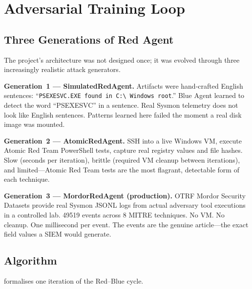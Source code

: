 \documentclass[sigconf, nonacm]{acmart}
\begin{document}
\section{Adversarial Training Loop}
\label{sec:loop}

\subsection{Three Generations of Red Agent}

The project's architecture was not designed once; it was evolved through
three increasingly realistic attack generators.

\textbf{Generation~1 — SimulatedRedAgent.} Artifacts were hand-crafted
English sentences: ``\texttt{PSEXESVC.EXE found in C:\textbackslash
Windows root}.'' Blue Agent learned to detect the word ``PSEXESVC''
in a sentence. Real Sysmon telemetry does not look like English sentences.
Patterns learned here failed the moment a real disk image was mounted.

\textbf{Generation~2 — AtomicRedAgent.} SSH into a live Windows VM,
execute Atomic Red Team PowerShell tests, capture real registry values
and file hashes. Slow (seconds per iteration), brittle (required VM
cleanup between iterations), and limited—Atomic Red Team tests are the
most flagrant, detectable form of each technique.

\textbf{Generation~3 — MordorRedAgent (production).} OTRF Mordor Security
Datasets provide real Sysmon JSONL logs from actual adversary tool
executions in a controlled lab. \num{49519} events across 8 MITRE
techniques. No VM. No cleanup. One millisecond per event. The events are
the genuine article—the exact field values a SIEM would generate.

\subsection{Algorithm}

 formalises one iteration of the Red–Blue cycle.
\end{document}
